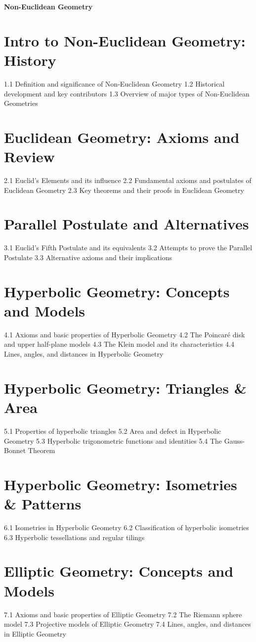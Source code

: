 {\LARGE \bf{Non-Euclidean Geometry}}
\section{Intro to Non-Euclidean Geometry: History}
1.1 Definition and significance of Non-Euclidean Geometry
1.2 Historical development and key contributors
1.3 Overview of major types of Non-Euclidean Geometries
\section{Euclidean Geometry: Axioms and Review}
2.1 Euclid's Elements and its influence
2.2 Fundamental axioms and postulates of Euclidean Geometry
2.3 Key theorems and their proofs in Euclidean Geometry
\section{Parallel Postulate and Alternatives}
3.1 Euclid's Fifth Postulate and its equivalents
3.2 Attempts to prove the Parallel Postulate
3.3 Alternative axioms and their implications
\section{Hyperbolic Geometry: Concepts and Models}
4.1 Axioms and basic properties of Hyperbolic Geometry
4.2 The Poincaré disk and upper half-plane models
4.3 The Klein model and its characteristics
4.4 Lines, angles, and distances in Hyperbolic Geometry
\section{Hyperbolic Geometry: Triangles \& Area}
5.1 Properties of hyperbolic triangles
5.2 Area and defect in Hyperbolic Geometry
5.3 Hyperbolic trigonometric functions and identities
5.4 The Gauss-Bonnet Theorem
\section{Hyperbolic Geometry: Isometries \& Patterns}
6.1 Isometries in Hyperbolic Geometry
6.2 Classification of hyperbolic isometries
6.3 Hyperbolic tessellations and regular tilings
\section{Elliptic Geometry: Concepts and Models}
7.1 Axioms and basic properties of Elliptic Geometry
7.2 The Riemann sphere model
7.3 Projective models of Elliptic Geometry
7.4 Lines, angles, and distances in Elliptic Geometry
